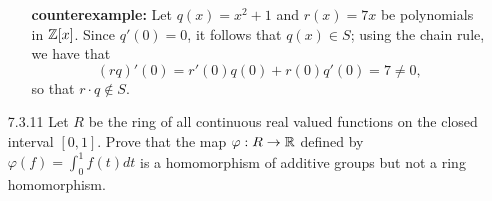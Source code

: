 \begin{enumerate}
\begin{enumerate}
               \textbf{counterexample:} Let $q(x) = x^2 + 1$ and $r(x) = 7x$ be
               polynomials in $\mathbb{Z}[x]$. Since $q'(0) = 0$, it follows that
               $q(x) \in S$; using the chain rule, we have that
               $$(rq)'(0) = r'(0)q(0) + r(0)q'(0) = 7 \neq 0,$$
               so that $r \cdot q \notin S$.
      \end{enumerate}
   \item[7.3.11]  Let $R$ be the ring of all continuous real valued functions on
                  the closed interval $[0, 1]$. Prove that the map
                  $\varphi : R \rightarrow \mathbb{R}$ defined by
                  $\varphi(f) = \int_0^1f(t)dt$ is a homomorphism of additive
                  groups but not a ring homomorphism.


\end{enumerate}
